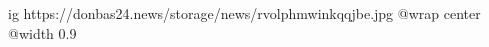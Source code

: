  
 
 
 
 

\ifcmt
	ig https://donbas24.news/storage/news/rvolphmwinkqqjbe.jpg
  @wrap center
  @width 0.9
\fi
